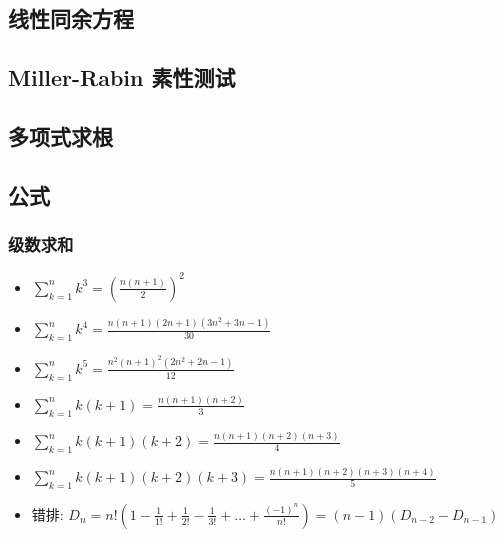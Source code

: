 \documentclass[10pt, a4paper]{article}
\begin{document}
  \subsection{线性同余方程}
    

  \subsection{Miller-Rabin 素性测试}
    

  \subsection{多项式求根}
    
  
  \subsection{公式}
    \subsubsection{级数求和}
    \begin{itemize}
    \item
      $\sum_{k=1}^{n}k^3 = (\frac{n(n+1)}{2})^2  $
    \item
      $\sum_{k=1}^{n}k^4 = \frac{n(n+1)(2n+1)(3n^2+3n-1)}{30}  $
    \item
      $\sum_{k=1}^{n}k^5 = \frac{n^2(n+1)^2(2n^2+2n-1)}{12}  $
    \item
      $\sum_{k=1}^{n}k(k+1) = \frac{n(n+1)(n+2)}{3}  $
    \item
      $\sum_{k=1}^{n}k(k+1)(k+2) = \frac{n(n+1)(n+2)(n+3)}{4} $
    \item
      $\sum_{k=1}^{n}k(k+1)(k+2)(k+3) = \frac{n(n+1)(n+2)(n+3)(n+4)}{5} $
    \item
      $\mbox{错排: }D_n = n!(1-\frac{1}{1!}+\frac{1}{2!}-\frac{1}{3!}+\ldots+\frac{(-1)^n}{n!}) = (n-1)(D_{n-2}-D_{n-1})$
    \end{itemize}
\end{document}
